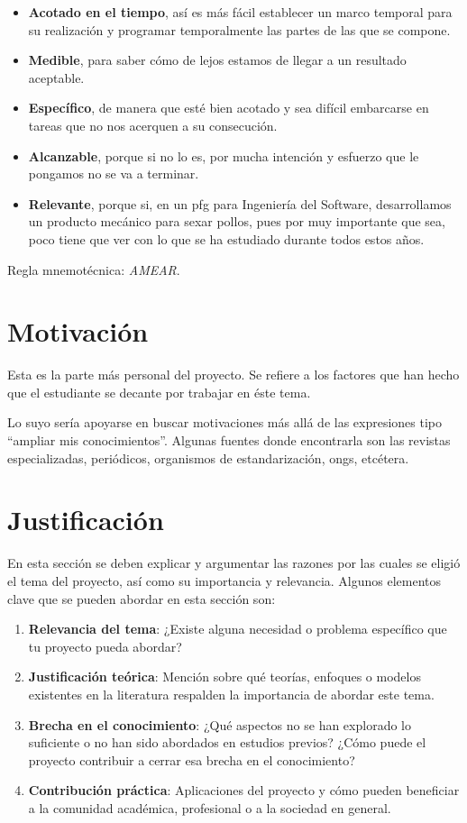 \begin{itemize}
    \item \textbf{Acotado en el tiempo}, así es más fácil establecer un marco temporal para su realización y programar temporalmente las partes de las que se compone.
    \item \textbf{Medible}, para saber cómo de lejos estamos de llegar a un resultado aceptable.
    \item \textbf{Específico}, de manera que esté bien acotado y sea difícil embarcarse en tareas que no nos acerquen a su consecución.
    \item \textbf{Alcanzable}, porque si no lo es, por mucha intención y esfuerzo que le pongamos no se va a terminar.
    \item \textbf{Relevante}, porque si, en un \gls{pfg} para Ingeniería del Software, desarrollamos un producto mecánico para sexar pollos, pues por muy importante que sea, poco tiene que ver con lo que se ha estudiado durante todos estos años.
\end{itemize}

Regla mnemotécnica: \textit{AMEAR}.

\section{Motivación}
Esta es la parte más personal del proyecto. Se refiere a los factores que han hecho que el estudiante se decante por trabajar en éste tema.

Lo suyo sería apoyarse en buscar motivaciones más allá de las expresiones tipo \enquote{ampliar mis conocimientos}. Algunas fuentes donde encontrarla son las revistas especializadas, periódicos, organismos de estandarización, \glspl{ong}, etcétera.

\section{Justificación}

En esta sección se deben explicar y argumentar las razones por las cuales se eligió el tema del proyecto, así como su importancia y relevancia. Algunos elementos clave que se pueden abordar en esta sección son:

\begin{enumerate}
    \item \textbf{Relevancia del tema}: ¿Existe alguna necesidad o problema específico que tu proyecto pueda abordar?
    \item \textbf{Justificación teórica}: Mención sobre qué teorías, enfoques o modelos existentes en la literatura respalden la importancia de abordar este tema.
    \item \textbf{Brecha en el conocimiento}: ¿Qué aspectos no se han explorado lo suficiente o no han sido abordados en estudios previos? ¿Cómo puede el proyecto contribuir a cerrar esa brecha en el conocimiento?
    \item \textbf{Contribución práctica}: Aplicaciones del proyecto y cómo pueden beneficiar a la comunidad académica, profesional o a la sociedad en general.
\end{enumerate}

